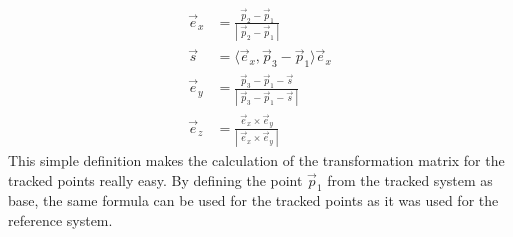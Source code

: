 \begin{align}
\vec{e}_{x} &= \frac{\vec{p}_{2} - \vec{p}_{1}}{\left |~ \vec{p}_{2} - \vec{p}_{1} ~\right |} \\
\vec{s} &= \langle\vec{e}_{x},\vec{p}_{3}-\vec{p}_{1}\rangle\vec{e}_{x} \\
\vec{e}_{y} &= \frac{\vec{p}_{3} - \vec{p}_{1} - \vec{s}}{\left |~ \vec{p}_{3} - \vec{p}_{1} - \vec{s}~\right |} \\
\vec{e}_{z} &= \frac{\vec{e}_{x} \times \vec{e}_{y}}{\left |~\vec{e}_{x} \times \vec{e}_{y}~\right |}
\end{align}
This simple definition makes the calculation of the transformation matrix for the tracked points really easy. By defining the point $\vec{p}_{1}$ from the tracked system as base, the same formula can be used for the tracked points as it was used for the reference system. 